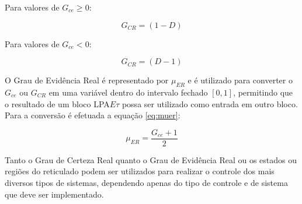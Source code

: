 Para valores de $G_{ce} \geq 0$: 

\begin{center}
\begin{equation}
G_{CR} = (1-D)
\end{equation}
\end{center}

Para valores de $G_{ce} < 0$:

\begin{center}
\begin{equation}
G_{CR} = (D-1)
\end{equation}
\end{center}


O Grau de Evidência Real é representado por $\mu_{ER}$ 
e é utilizado para converter o $G_{ce}$ ou $G_{CR}$ 
em uma variável dentro do intervalo fechado $[0,1]$, 
permitindo que o resultado de um bloco LPA$E\tau$ 
possa ser utilizado como entrada em outro bloco. 
Para a conversão é efetuada a equação \ref{eq:muer}:


\begin{equation}
\mu_{ER} = \frac{G_{ce} + 1}{2}
\label{eq:muer}
\end{equation}


Tanto o Grau de Certeza Real quanto o Grau de Evidência Real 
ou os estados ou regiões do reticulado 
podem ser utilizados para realizar o controle dos mais diversos tipos de sistemas, 
dependendo apenas do tipo de controle e de sistema que deve ser implementado. 


